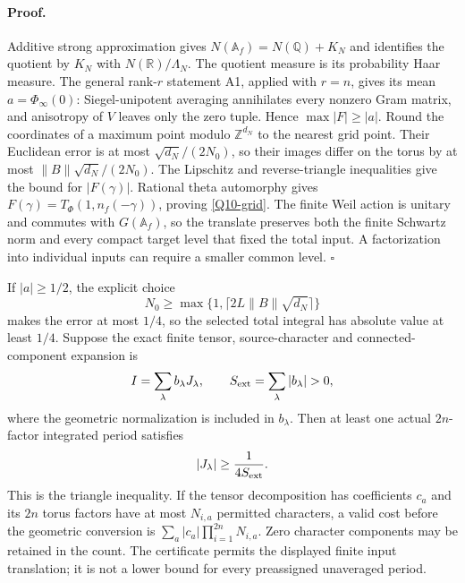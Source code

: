 \documentclass[11pt]{article}
\newcommand{\Q}{\mathbb Q}\newcommand{\C}{\mathbb C}\newcommand{\Z}{\mathbb Z}\newcommand{\R}{\mathbb R}\newcommand{\A}{\mathbb A}\newcommand{\OO}{\mathcal O}
\theoremstyle{definition}\newtheorem{definition}[theorem]{Definition}\newtheorem{remark}[theorem]{Remark}
\begin{document}
\paragraph{Proof.}
Additive strong approximation gives
$N(\A_f)=N(\Q)+K_N$ and identifies the quotient by $K_N$
with $N(\R)/\Lambda_N$. The quotient measure is its probability
Haar measure. The general rank-$r$ statement A1, applied with
$r=n$, gives its mean $a=\Phi_\infty(0)$: Siegel-unipotent
averaging annihilates every nonzero Gram matrix, and anisotropy
of $V$ leaves only the zero tuple. Hence
$\max |F|\geq|a|$.
Round the coordinates of a maximum point modulo $\Z^{d_N}$ to
the nearest grid point. Their Euclidean error is at most
$\sqrt{d_N}/(2N_0)$, so their images differ on the torus by at
most $\|B\|\sqrt{d_N}/(2N_0)$. The Lipschitz and reverse-triangle
inequalities give the bound for $|F(\gamma)|$.
Rational theta automorphy gives
$F(\gamma)=T_\Phi(1,n_f(-\gamma))$, proving
\eqref{Q10-grid}. The finite Weil action is unitary and commutes
with $G(\A_f)$, so the translate preserves both the finite
Schwartz norm and every compact target level that fixed the total
input. A factorization into individual inputs can require a
smaller common level. \hfill$\square$

If $|a|\geq1/2$, the explicit choice
\[
 N_0\geq\max\{1,\lceil2L\|B\|\sqrt{d_N}\rceil\}
\]
makes the error at most $1/4$, so the selected total integral
has absolute value at least $1/4$. Suppose the exact finite
tensor, source-character and connected-component expansion is
\[
 I=\sum_\lambda b_\lambda J_\lambda,\qquad
 S_{\rm ext}=\sum_\lambda|b_\lambda|>0,
\]
where the geometric normalization is included in $b_\lambda$.
Then at least one actual $2n$-factor integrated period satisfies
\begin{equation}\label{Q10-extract}
 |J_\lambda|\geq\frac{1}{4S_{\rm ext}}.
\end{equation}
This is the triangle inequality. If the tensor decomposition has
coefficients $c_a$ and its $2n$ torus factors have at most
$N_{i,a}$ permitted characters, a valid cost before the geometric
conversion is
$\sum_a|c_a|\prod_{i=1}^{2n}N_{i,a}$.
Zero character components may be retained in the count. The
certificate permits the displayed finite input translation; it
is not a lower bound for every preassigned unaveraged period.
\end{document}
